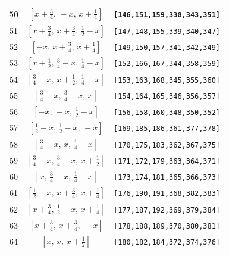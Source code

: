 \documentclass[fleqn,8pt]{jsarticle}
\begin{document}
\begin{longtable}{ccc}
50 & $\left[ x + \frac{3}{4},\, - x,\, x + \frac{1}{4} \right]$ & {\tt [146,151,159,338,343,351]} \\ \hline
51 & $\left[ x + \frac{3}{4},\, x + \frac{3}{4},\, \frac{1}{2} - x \right]$ & {\tt [147,148,155,339,340,347]} \\ \hline
52 & $\left[ - x,\, x + \frac{3}{4},\, x + \frac{1}{4} \right]$ & {\tt [149,150,157,341,342,349]} \\ \hline
53 & $\left[ x + \frac{1}{2},\, \frac{3}{4} - x,\, \frac{1}{4} - x \right]$ & {\tt [152,166,167,344,358,359]} \\ \hline
54 & $\left[ \frac{3}{4} - x,\, x + \frac{1}{2},\, \frac{1}{4} - x \right]$ & {\tt [153,163,168,345,355,360]} \\ \hline
55 & $\left[ \frac{3}{4} - x,\, \frac{3}{4} - x,\, x \right]$ & {\tt [154,164,165,346,356,357]} \\ \hline
56 & $\left[ - x,\, - x,\, \frac{1}{2} - x \right]$ & {\tt [156,158,160,348,350,352]} \\ \hline
57 & $\left[ \frac{1}{2} - x,\, \frac{1}{2} - x,\, - x \right]$ & {\tt [169,185,186,361,377,378]} \\ \hline
58 & $\left[ \frac{3}{4} - x,\, x,\, \frac{1}{4} - x \right]$ & {\tt [170,175,183,362,367,375]} \\ \hline
59 & $\left[ \frac{3}{4} - x,\, \frac{3}{4} - x,\, x + \frac{1}{2} \right]$ & {\tt [171,172,179,363,364,371]} \\ \hline
60 & $\left[ x,\, \frac{3}{4} - x,\, \frac{1}{4} - x \right]$ & {\tt [173,174,181,365,366,373]} \\ \hline
61 & $\left[ \frac{1}{2} - x,\, x + \frac{3}{4},\, x + \frac{1}{4} \right]$ & {\tt [176,190,191,368,382,383]} \\ \hline
62 & $\left[ x + \frac{3}{4},\, \frac{1}{2} - x,\, x + \frac{1}{4} \right]$ & {\tt [177,187,192,369,379,384]} \\ \hline
63 & $\left[ x + \frac{3}{4},\, x + \frac{3}{4},\, - x \right]$ & {\tt [178,188,189,370,380,381]} \\ \hline
64 & $\left[ x,\, x,\, x + \frac{1}{2} \right]$ & {\tt [180,182,184,372,374,376]} \\
\end{longtable}
\renewcommand{\arraystretch}{1.2}
\end{document}
